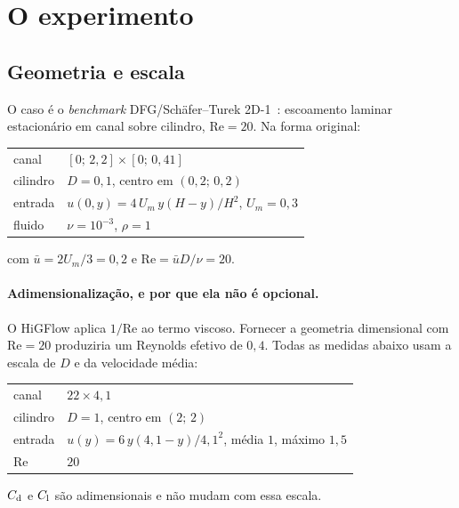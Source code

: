 \section{O experimento}
\label{sec:experimento}

\subsection{Geometria e escala}

O caso é o \emph{benchmark} DFG/Schäfer--Turek 2D-1~\cite{schafer1996}:
escoamento laminar estacionário em canal sobre cilindro, $\mathrm{Re}=20$. Na
forma original:

\begin{center}
\begin{tabular}{ll}
  \toprule
  canal    & $[0;\,2{,}2] \times [0;\,0{,}41]$ \\
  cilindro & $D = 0{,}1$, centro em $(0{,}2;\,0{,}2)$ \\
  entrada  & $u(0,y) = 4\,U_m\,y(H-y)/H^2$, \; $U_m = 0{,}3$ \\
  fluido   & $\nu = 10^{-3}$, $\rho = 1$ \\
  \bottomrule
\end{tabular}
\end{center}

com $\bar{u} = 2U_m/3 = 0{,}2$ e $\mathrm{Re} = \bar{u}D/\nu = 20$.

\paragraph{Adimensionalização, e por que ela não é opcional.} O HiGFlow aplica
$1/\mathrm{Re}$ ao termo viscoso. Fornecer a geometria dimensional com
$\mathrm{Re}=20$ produziria um Reynolds efetivo de $0{,}4$. Todas as medidas
abaixo usam a escala de $D$ e da velocidade média:

\begin{center}
\begin{tabular}{ll}
  \toprule
  canal    & $22 \times 4{,}1$ \\
  cilindro & $D = 1$, centro em $(2;\,2)$ \\
  entrada  & $u(y) = 6\,y(4{,}1-y)/4{,}1^2$, \; média $1$, máximo $1{,}5$ \\
  $\mathrm{Re}$ & $20$ \\
  \bottomrule
\end{tabular}
\end{center}

$C_{\mathrm{d}}$ e $C_{\mathrm{l}}$ são adimensionais e não mudam com essa escala.

